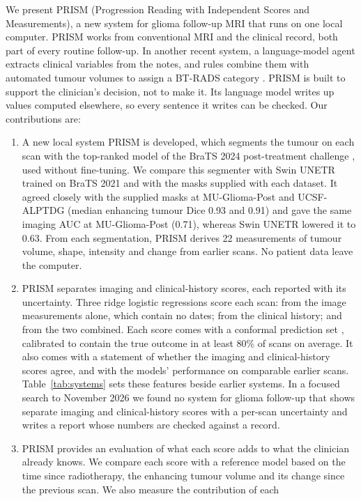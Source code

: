 \documentclass[largeformat]{interact} %
\begin{document}
We present PRISM (Progression Reading with Independent Scores and Measurements), a new system for glioma follow-up MRI
that runs on one local computer. PRISM works from conventional MRI and the clinical record, both part of every
routine follow-up. In another recent system, a language-model agent extracts clinical variables from the notes, and
rules combine them with automated tumour volumes to assign a BT-RADS category \citep{jabal2026}. PRISM is built to support
the clinician's decision, not to make it. Its language model writes up values computed elsewhere, so every sentence
it writes can be checked. Our
contributions are:
\begin{enumerate}
\item A new local system PRISM is developed, which segments the tumour on each scan with the top-ranked model of the BraTS 2024
post-treatment challenge \citep{ferreira2024}, used without fine-tuning. We compare this segmenter with Swin UNETR
\citep{hatamizadeh2022} trained on BraTS 2021 \citep{baid2021} and with the masks supplied with each dataset. It agreed closely with the
supplied masks at MU-Glioma-Post and UCSF-ALPTDG (median enhancing tumour Dice 0.93 and 0.91) and gave the same imaging AUC at MU-Glioma-Post (0.71), whereas Swin UNETR lowered it to 0.63. From each segmentation,
PRISM derives 22 measurements of tumour volume, shape, intensity and change from earlier scans. No patient data leave
the computer.
\item PRISM separates imaging and clinical-history scores, each reported with its uncertainty. Three ridge logistic
regressions \citep{lecessie1992} score each scan: from the image measurements alone, which contain no dates; from the
clinical history; and from the two combined. Each score comes with a conformal prediction set
\citep{angelopoulos2023}, calibrated to contain the true outcome in at least 80\% of scans on average. It also comes with a statement of
whether the imaging and clinical-history scores agree, and with the models' performance on comparable earlier scans.
Table~\ref{tab:systems} sets these features beside earlier systems. In a focused search to November 2026 we found
no system for glioma follow-up that shows separate imaging and clinical-history scores with a per-scan uncertainty
and writes a report whose numbers are checked against a record.
\item PRISM provides an evaluation of what each score adds to what the clinician already knows. We compare each score with a reference
model based on the time since radiotherapy, the enhancing tumour volume and its change since the previous scan. We also measure the contribution of each

\end{enumerate}
\end{document}
